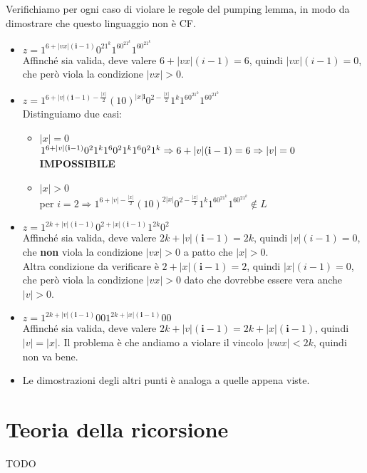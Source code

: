 \documentclass[a4paper,oneside]{scrbook}
\newcommand{\greenmark}{\quad \textcolor{green}{\checkmark}}
\begin{document}
%	
%	
%	
%	
%	
Verifichiamo per ogni caso di violare le regole del pumping lemma, in modo da dimostrare che questo linguaggio non è CF.
\begin{itemize}
	\item $z=1^{6+|vx|(\textbf{i}-1)}0^21^k1^60^21^k1^60^21^k$\\
	Affinché sia valida, deve valere $6+|vx|(i-1)=6$, quindi $|vx|(i-1)=0$, che però viola la condizione $|vx|>0$. \greenmark
	
	\item $z=1^{6+|v|(\textbf{i}-1)-\frac{|x|}{2}}(10)^{|x|\textbf{i}}0^{2-\frac{|x|}{2}}1^k1^60^21^k1^60^21^k$\\
	Distinguiamo due casi:
	\begin{itemize}
		\item $|x|=0$\\
		$1^{6+|v|(\textbf{i}-1)}0^21^k1^60^21^k1^60^21^k \Rightarrow \\6+|v|(\textbf{i}-1)=6 \Rightarrow |v|=0$ \textbf{IMPOSSIBILE} \greenmark
		\item $|x|>0$\\
		per $i=2 \Rightarrow 1^{6+|v|-\frac{|x|}{2}}(10)^{2|x|}0^{2-\frac{|x|}{2}}1^k1^60^21^k1^60^21^k \notin L$ \greenmark
	\end{itemize}
	
	\item $z=1^{2k+|v|(\textbf{i}-1)}0^{2+|x|(\textbf{i}-1)}1^{2k}0^2$\\
	Affinché sia valida, deve valere $2k+|v|(\textbf{i}-1)=2k$, quindi $|v|(i-1)=0$, che \textbf{non} viola la condizione $|vx|>0$ a patto che $|x|>0$.\\
	Altra condizione da verificare è $2+|x|(\textbf{i}-1)=2$, quindi $|x|(i-1)=0$, che però viola la condizione $|vx|>0$ dato che dovrebbe essere vera anche $|v|>0$. \greenmark
	
	\item $z=1^{2k+|v|(\textbf{i}-1)}001^{2k+|x|(\textbf{i}-1)}00$\\
	Affinché sia valida, deve valere $2k+|v|(\textbf{i}-1)=2k+|x|(\textbf{i}-1)$, quindi $|v|=|x|$. Il problema è che andiamo a violare il vincolo $|vwx|<2k$, quindi non va bene. \greenmark
	
	\item Le dimostrazioni degli altri punti è analoga a quelle appena viste.
\end{itemize}

\chapter{Teoria della ricorsione}
TODO
\end{document}
